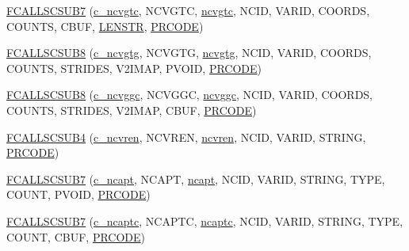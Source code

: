 \begin{DoxyCompactItemize}
\item 
\hyperlink{fort-v2compat_8c_a46ec598b1b68f552a6a9886330e8e9fb}{F\+C\+A\+L\+L\+S\+C\+S\+U\+B7} (\hyperlink{nf__v2compat_8c_a665567929170d07d23a7dad0eea4bea6}{c\+\_\+ncvgtc}, N\+C\+V\+G\+TC, \hyperlink{nf__fortv2_8f90_a81ac17ea93b907a54fc2557bf3ace40a}{ncvgtc}, N\+C\+ID, V\+A\+R\+ID, C\+O\+O\+R\+DS, C\+O\+U\+N\+TS, C\+B\+UF, \hyperlink{fort-v2compat_8c_afcbdb4ceefc87947c1f6254df71bdb36}{L\+E\+N\+S\+TR}, \hyperlink{fort-v2compat_8c_ae2352f39cbd25bcaf1bedbbb12db73fe}{P\+R\+C\+O\+DE})
\item 
\hyperlink{fort-v2compat_8c_a305ee7c600c6085063a961e9926b8c40}{F\+C\+A\+L\+L\+S\+C\+S\+U\+B8} (\hyperlink{nf__v2compat_8c_aa58c98f7f3a1bbc8e80d0ff3fce13190}{c\+\_\+ncvgtg}, N\+C\+V\+G\+TG, \hyperlink{nf__fortv2_8f90_ae0fbe2588278893dcab19ab604767a7d}{ncvgtg}, N\+C\+ID, V\+A\+R\+ID, C\+O\+O\+R\+DS, C\+O\+U\+N\+TS, S\+T\+R\+I\+D\+ES, V2\+I\+M\+AP, P\+V\+O\+ID, \hyperlink{fort-v2compat_8c_ae2352f39cbd25bcaf1bedbbb12db73fe}{P\+R\+C\+O\+DE})
\item 
\hyperlink{fort-v2compat_8c_a6f4f22a1bac85a6b575ccb6725a30b4c}{F\+C\+A\+L\+L\+S\+C\+S\+U\+B8} (\hyperlink{nf__v2compat_8c_a63f13eb2d14b6e465c7011f39762c745}{c\+\_\+ncvggc}, N\+C\+V\+G\+GC, \hyperlink{nf__fortv2_8f90_aa02cb955f7bb1ae0f370492cfaae7b6f}{ncvggc}, N\+C\+ID, V\+A\+R\+ID, C\+O\+O\+R\+DS, C\+O\+U\+N\+TS, S\+T\+R\+I\+D\+ES, V2\+I\+M\+AP, C\+B\+UF, \hyperlink{fort-v2compat_8c_ae2352f39cbd25bcaf1bedbbb12db73fe}{P\+R\+C\+O\+DE})
\item 
\hyperlink{fort-v2compat_8c_a557291686562f07d1ddc65b343dac894}{F\+C\+A\+L\+L\+S\+C\+S\+U\+B4} (\hyperlink{nf__v2compat_8c_a3f3248eb07164659e5e4abcd5cf336d1}{c\+\_\+ncvren}, N\+C\+V\+R\+EN, \hyperlink{nf__fortv2_8f90_a8de81d99a1275d61dabb79e14a84c1f6}{ncvren}, N\+C\+ID, V\+A\+R\+ID, S\+T\+R\+I\+NG, \hyperlink{fort-v2compat_8c_ae2352f39cbd25bcaf1bedbbb12db73fe}{P\+R\+C\+O\+DE})
\item 
\hyperlink{fort-v2compat_8c_a25aa8639f820d413d9c263a8a29f162b}{F\+C\+A\+L\+L\+S\+C\+S\+U\+B7} (\hyperlink{nf__v2compat_8c_a15af034ea9165af45a02315b3320dab1}{c\+\_\+ncapt}, N\+C\+A\+PT, \hyperlink{nf__fortv2_8f90_a7572a6d6e1628e2868cef69a3d147c38}{ncapt}, N\+C\+ID, V\+A\+R\+ID, S\+T\+R\+I\+NG, T\+Y\+PE, C\+O\+U\+NT, P\+V\+O\+ID, \hyperlink{fort-v2compat_8c_ae2352f39cbd25bcaf1bedbbb12db73fe}{P\+R\+C\+O\+DE})
\item 
\hyperlink{fort-v2compat_8c_a6584fce06fb0b25e58067f361f19bc73}{F\+C\+A\+L\+L\+S\+C\+S\+U\+B7} (\hyperlink{nf__v2compat_8c_aed57d7a73cd3e59ce0a99597aa180e7b}{c\+\_\+ncaptc}, N\+C\+A\+P\+TC, \hyperlink{nf__fortv2_8f90_a525301fbfb8b1e885e1531ed31e16565}{ncaptc}, N\+C\+ID, V\+A\+R\+ID, S\+T\+R\+I\+NG, T\+Y\+PE, C\+O\+U\+NT, C\+B\+UF, \hyperlink{fort-v2compat_8c_ae2352f39cbd25bcaf1bedbbb12db73fe}{P\+R\+C\+O\+DE})

\end{DoxyCompactItemize}
